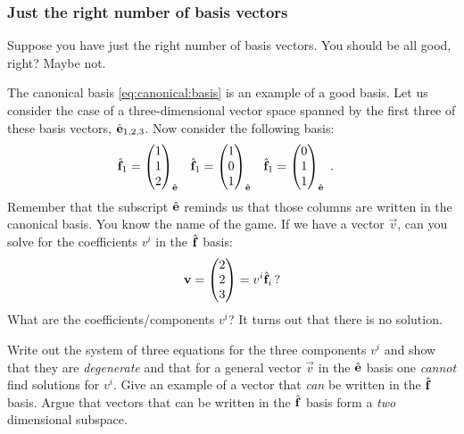 \subsubsection{Just the right number of basis vectors}

Suppose you have just the right number of basis vectors. You should be all good, right? Maybe not. 
\begin{example}
The canonical basis \eqref{eq:canonical:basis} is an example of a good basis. Let us consider the case of a three-dimensional vector space spanned by the first three of these basis vectors, $\hat{\mathbf{e}}_{1,2,3}$. Now consider the following basis:
\begin{align}
    \hat{\mathbf{f}}_1 &=
    \begin{pmatrix}
    1 \\ 1 \\ 2  
    \end{pmatrix}_{\hat{\mathbf{e}}}
    &
    \hat{\mathbf{f}}_1 &=
    \begin{pmatrix}
    1 \\ 0 \\ 1  
    \end{pmatrix}_{\hat{\mathbf{e}}}
    &
    \hat{\mathbf{f}}_1 &=
    \begin{pmatrix}
    0 \\ 1 \\ 1  
    \end{pmatrix}_{\hat{\mathbf{e}}} \ .
    \label{eq:eg:basis:lin:dependent}
\end{align}
Remember that the subscript $\hat{\mathbf{e}}$ reminds us that those columns are written in the canonical basis.
You know the name of the game. If we have a vector $\vec{v}$, can you solve for the coefficients $v^i$ in the $\hat{\mathbf{f}}$ basis:
\begin{align}
    \mathbf{v} = 
    \begin{pmatrix}
        2 \\ 2 \\ 3
    \end{pmatrix}
    = v^i \hat{\mathbf{f}}_i \, ?
\end{align}
What are the coefficients/components $v^i$? It turns out that there is no solution.
\end{example}
\begin{exercise}
Write out the system of three equations for the three components $v^i$ and show that they are \emph{degenerate} and that for a general vector $\vec{v}$ in the $\hat{\mathbf{e}}$ basis one \emph{cannot} find solutions for $v^i$. Give an example of a vector that \emph{can} be written in the $\hat{\mathbf{f}}$ basis. Argue that vectors that can be written in the $\hat{\mathbf{f}}$ basis form a \emph{two} dimensional subspace.
\end{exercise}

